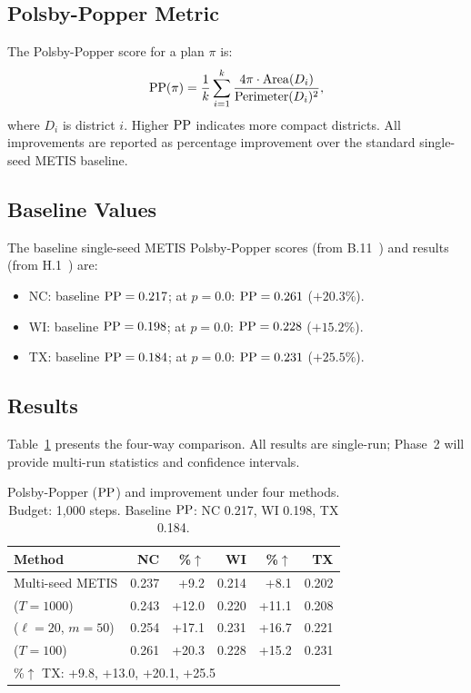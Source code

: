\subsection{Polsby-Popper Metric}

The Polsby-Popper score for a plan $\pi$ is:
\[
  \mathrm{PP}(\pi) = \frac{1}{k} \sum_{i=1}^k \frac{4\pi \cdot \mathrm{Area}(D_i)}{\mathrm{Perimeter}(D_i)^2},
\]
where $D_i$ is district $i$.
Higher $\mathrm{PP}$ indicates more compact districts.
All improvements are reported as percentage improvement over the
standard single-seed METIS baseline.

\subsection{Baseline Values}

The baseline single-seed METIS Polsby-Popper scores (from B.11~\citep{b11paper})
and \be{} results (from H.1~\citep{h1paper}) are:
\begin{itemize}
\item NC: baseline $\mathrm{PP} = 0.217$; \be{} at $p = 0.0$: $\mathrm{PP} = 0.261$
      ($+20.3\%$).
\item WI: baseline $\mathrm{PP} = 0.198$; \be{} at $p = 0.0$: $\mathrm{PP} = 0.228$
      ($+15.2\%$).
\item TX: baseline $\mathrm{PP} = 0.184$; \be{} at $p = 0.0$: $\mathrm{PP} = 0.231$
      ($+25.5\%$).
\end{itemize}

\subsection{Results}

Table~\ref{tab:comparison} presents the four-way comparison.
All results are single-run; Phase~2 will provide multi-run statistics
and confidence intervals.

\begin{table}[h]
\centering
\footnotesize
\setlength{\tabcolsep}{5pt}
\caption{Polsby-Popper ($\mathrm{PP}$) and improvement under four methods.
         Budget: 1{,}000 \recom{} steps.
         Baseline $\mathrm{PP}$: NC 0.217, WI 0.198, TX 0.184.}
\label{tab:comparison}
\begin{tabular}{lrrrrr}
\toprule
Method & NC & \%$\uparrow$ & WI & \%$\uparrow$ & TX \\
\midrule
Multi-seed METIS  & 0.237 & +9.2  & 0.214 & +8.1  & 0.202 \\
\cs{} ($T=1000$)  & 0.243 & +12.0 & 0.220 & +11.1 & 0.208 \\
\shb{} ($\ell=20$, $m=50$) & 0.254 & +17.1 & 0.231 & +16.7 & 0.221 \\
\be{} ($T=100$)   & 0.261 & +20.3 & 0.228 & +15.2 & 0.231 \\
\midrule
\multicolumn{6}{l}{\%$\uparrow$ TX: +9.8, +13.0, +20.1, +25.5} \\
\bottomrule
\end{tabular}
\end{table}

